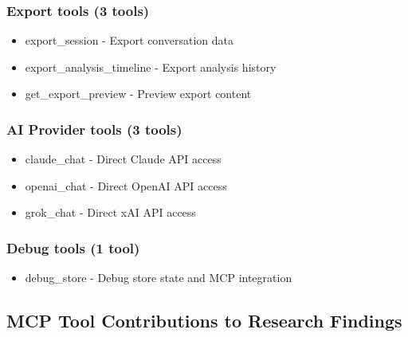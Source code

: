 \documentclass[11pt,letterpaper]{article}
\begin{document}
\subsubsection{Export tools (3 tools)}
\begin{itemize}
    \item export\_session - Export conversation data
    \item export\_analysis\_timeline - Export analysis history
    \item get\_export\_preview - Preview export content
\end{itemize}

\subsubsection{AI Provider tools (3 tools)}
\begin{itemize}
    \item claude\_chat - Direct Claude API access
    \item openai\_chat - Direct OpenAI API access
    \item grok\_chat - Direct xAI API access
\end{itemize}

\subsubsection{Debug tools (1 tool)}
\begin{itemize}
    \item debug\_store - Debug store state and MCP integration
\end{itemize}

\subsection{MCP Tool Contributions to Research Findings}
\end{document}
